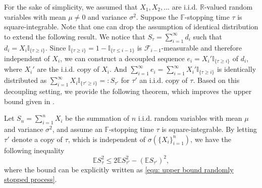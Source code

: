 \documentclass[ECP]{ejpecp} %
\newcommand{\R}{\mathbb{R}}
\newcommand{\F}{\mathcal{F}}
\newcommand{\II}{\mathbb{I}}
\newcommand{\E}{\mathbb{E}}
\newcommand{\sumn}{\sum\limits_{i=1}^n}
\begin{document}
For the sake of simplicity, we assumed that $X_1, X_2,...$ are i.i.d.  $\R$-valued random variables with mean $\mu \neq 0$ and variance $\sigma^2$. Suppose the $\mathbb{F}$-stopping time $\tau$ is square-integrable. Note that one can drop the assumption of identical distribution to extend the following result. We notice that $S_\tau = \sum\limits_{i=1}^{\infty} d_i$ such that $d_i = X_i \II_{\{\tau\geq i\}}$. Since $ \II_{\{\tau\geq i\}} = 1 -  \II_{\{\tau\leq i-1\}}$ is $\F_{i-1}$-measurable and therefore independent of $X_i$, we can construct a decoupled sequence $e_i = X_i' \II_{\{\tau\geq i\}}$ of $d_i$, where $X_i'$ are the i.i.d. copy of $X_i$. And $\sum\limits_{i=1}^{\infty} e_i = \sum\limits_{i=1}^{\infty} X_i' \II_{\{\tau\geq i\}}$ is identically distributed as $ \sum\limits_{i=1}^{\infty} X_i \II_{\{\tau'\geq i\}} =: S_{\tau'}$ for $\tau'$ an i.i.d. copy of $\tau$. Based on this decoupling setting, we provide the following theorem, which improves the upper bound given in \cite{de1992note}.

\begin{theorem}
    \label{thm: application to randomly stopped process}
    Let $S_n = \sumn X_i$ be the summation of $n$ i.i.d. random variables with mean $\mu$ and variance $\sigma^2$, and assume an $\mathbb F$-stopping time $\tau$ is square-integrable. By letting $\tau'$ denote a copy of $\tau$, which is independent of $\sigma(\{X_i\}_{i=1}^n)$, we have the following inequality
    \begin{equation}
        \label{equ: L2 norm of randomly stopped sums}
        \E S^2_{\tau}\leq 2 \E S^2_{\tau'} - (\E S_{\tau'})^2,
    \end{equation}
    where the bound can be explicitly written as \eqref{equ: upper bound randomly stopped process}.
\end{theorem}
\end{document}
